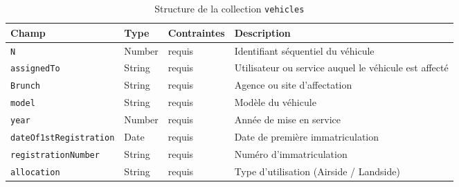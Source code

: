 \documentclass[a4paper,11pt]{report}
\begin{document}
\begin{table}[ht]
  \centering
  \small
  \caption{Structure de la collection \texttt{vehicles}}
  \label{tab:vehicles-schema}
  \begin{tabularx}{\textwidth}{l X l X}
    \toprule
    \bf Champ                   & \bf Type     & \bf Contraintes                     & \bf Description                                     \\
    \midrule
    \texttt{N}                  & Number       & requis                              & Identifiant séquentiel du véhicule                  \\
    \addlinespace
    \texttt{assignedTo}         & String       & requis                              & Utilisateur ou service auquel le véhicule est affecté \\
    \addlinespace
    \texttt{Brunch}             & String       & requis                              & Agence ou site d’affectation                        \\
    \addlinespace
    \texttt{model}              & String       & requis                              & Modèle du véhicule                                  \\
    \addlinespace
    \texttt{year}               & Number       & requis                              & Année de mise en service                            \\
    \addlinespace
    \texttt{dateOf1stRegistration} & Date      & requis                              & Date de première immatriculation                    \\
    \addlinespace
    \texttt{registrationNumber} & String       & requis                              & Numéro d’immatriculation                            \\
    \addlinespace
    \texttt{allocation}         & String       & requis                              & Type d’utilisation (Airside / Landside)             \\
    \bottomrule
  \end{tabularx}
\end{table}

\vspace{1em}
\end{document}
